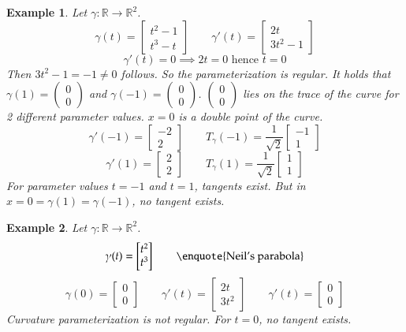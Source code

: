 \documentclass{article}
\newtheorem{example}{Example}  \numberwithin{example}{section}
\newcommand{\vectwo}[2]{\begin{pmatrix} #1 \\ #2 \end{pmatrix}}
\begin{document}
\begin{example}
  Let $\gamma: \mathbb R \to \mathbb R^2$.
  \[ \gamma(t) = \begin{bmatrix} t^2 - 1 \\ t^3 - t \end{bmatrix} \qquad \gamma'(t) = \begin{bmatrix} 2t \\ 3t^2 - 1 \end{bmatrix} \]
  \[ \gamma'(t) = 0 \implies 2t = 0 \text{ hence } t = 0 \]
  Then $3t^2 - 1 = -1 \neq 0$ follows.
  So the parameterization is \emph{regular}. It holds that $\gamma(1) = \vectwo 00$ and $\gamma(-1) = \vectwo 00$.
  $\vectwo 00$ lies on the trace of the curve for 2 different parameter values.
  $x = 0$ is a double point of the curve.
  \[ \gamma'(-1) = \begin{bmatrix} -2 \\ 2 \end{bmatrix} \qquad T_{\gamma}(-1) = \frac1{\sqrt{2}} \begin{bmatrix} -1 \\ 1 \end{bmatrix} \]
  \[ \gamma'(1) = \begin{bmatrix} 2 \\ 2 \end{bmatrix} \qquad T_{\gamma}(1) = \frac1{\sqrt{2}} \begin{bmatrix} 1 \\ 1 \end{bmatrix} \]
  For parameter values $t = -1$ and $t = 1$, tangents exist. But in $x = 0 = \gamma(1) = \gamma(-1)$, no tangent exists.
\end{example}

\begin{example}
  Let $\gamma: \mathbb R \to \mathbb R^2$.
  \[ \gamma(t) = \begin{bmatrix} t^2 \\ t^3 \end{bmatrix} \qquad \text{\enquote{Neil's parabola}} \]
  \[ \gamma(0) = \begin{bmatrix} 0 \\ 0 \end{bmatrix} \qquad \gamma'(t) = \begin{bmatrix} 2t \\ 3t^2 \end{bmatrix} \qquad \gamma'(t) = \begin{bmatrix} 0 \\ 0 \end{bmatrix} \]
  Curvature parameterization is not regular.
  For $t = 0$, no tangent exists.
\end{example}
\end{document}
